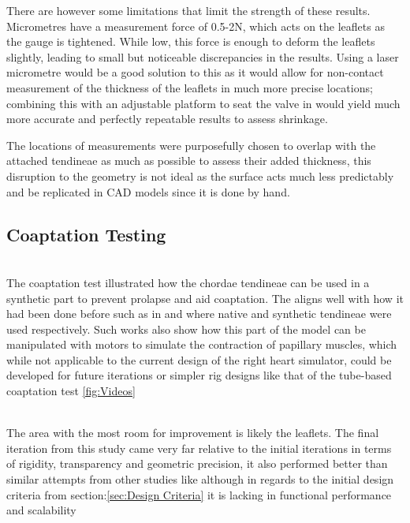 There are however some limitations that limit the strength of these results. Micrometres have a measurement force of 0.5-2N, which acts on the leaflets as the gauge is tightened. While low, this force is enough to deform the leaflets slightly, leading to small but noticeable discrepancies in the results. Using a laser micrometre would be a good solution to this as it would allow for non-contact measurement of the thickness of the leaflets in much more precise locations; combining this with an adjustable platform to seat the valve in would yield much more accurate and perfectly repeatable results to assess shrinkage.

The locations of measurements were purposefully chosen to overlap with the attached tendineae as much as possible to assess their added thickness, this disruption to the geometry is not ideal as the surface acts much less predictably and be replicated in \gls{CAD} models since it is done by hand.


\subsection{Coaptation Testing}
\\
The coaptation test illustrated how the chordae tendineae can be used in a synthetic part to prevent prolapse and aid coaptation. The aligns well with how it had been done before such as in  and  where native and synthetic tendineae were used respectively. Such works also show how this part of the model can be manipulated with motors to simulate the contraction of papillary muscles, which while not applicable to the current design of the right heart simulator, could be developed for future iterations or simpler rig designs like that of the tube-based coaptation test \cref{fig:Videos}

\\
The area with the most room for improvement is likely the leaflets. The final iteration from this study came very far relative to the initial iterations in terms of rigidity, transparency and geometric precision, it also performed better than similar attempts from other studies like  although in regards to the initial design criteria from section:\cref{sec:Design Criteria}  it is lacking in functional performance and scalability

